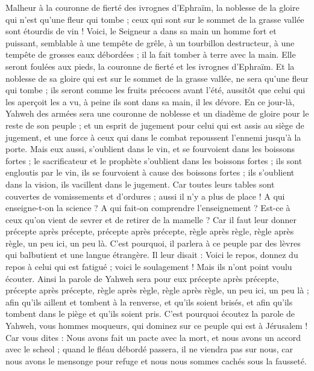 \begin{multicols}{2}
\VerseOne{}Malheur à la couronne de fierté des ivrognes d'Ephraïm, la noblesse de la gloire qui n'est qu'une fleur qui tombe ; ceux qui sont sur le sommet de la grasse vallée sont étourdis de vin !
Voici, le Seigneur a dans sa main un homme fort et puissant, semblable à une tempête de grêle, à un tourbillon destructeur, à une tempête de grosses eaux débordées ; il la fait tomber à terre avec la main.
Elle seront foulées aux pieds, la couronne de fierté et les ivrognes d'Ephraïm.
Et la noblesse de sa gloire qui est sur le sommet de la grasse vallée, ne sera qu'une fleur qui tombe ; ils seront comme les fruits précoces avant l'été, aussitôt que celui qui les aperçoit les a vu, à peine ils sont dans sa main, il les dévore.  
En ce jour-là, Yahweh des armées sera une couronne de noblesse et un diadème de gloire pour le reste de son peuple ;
et un esprit de jugement pour celui qui est assis au siège de jugement, et une force à ceux qui dans le combat repoussent l'ennemi jusqu'à la porte.
Mais eux aussi, s'oublient dans le vin, et se fourvoient dans les boissons fortes ; le sacrificateur et le prophète s'oublient dans les boissons fortes ; ils sont engloutis par le vin, ils se fourvoient à cause des boissons fortes ; ils s'oublient dans la vision, ils vacillent dans le jugement.
Car toutes leurs tables sont couvertes de vomissements et d'ordures ; aussi il n'y a plus de place !
A qui enseigne-t-on la science ? A qui fait-on comprendre l'enseignement ? Est-ce à ceux qu'on vient de sevrer et de retirer de la mamelle ?
Car il faut leur donner précepte après précepte, précepte après précepte, règle après règle, règle après règle, un peu ici, un peu là.
C'est pourquoi, il parlera à ce peuple par des lèvres qui balbutient et une langue étrangère.
Il leur disait : Voici le repos, donnez du repos à celui qui est fatigué ;  voici le soulagement ! Mais ils n'ont point voulu écouter.
Ainsi la parole de Yahweh sera pour eux précepte après précepte, précepte après précepte, règle après règle, règle après règle, un peu ici, un peu là ; afin qu'ils aillent et tombent à la renverse, et qu'ils soient brisés, et afin qu'ils tombent dans le piège et qu'ils soient pris.
C'est pourquoi écoutez la parole de Yahweh, vous hommes moqueurs, qui dominez sur ce peuple qui est à Jérusalem !
Car vous dites : Nous avons fait un pacte avec la mort, et nous avons un accord avec le scheol ; quand le fléau débordé passera, il ne viendra pas sur nous, car nous avons le mensonge pour refuge et nous nous sommes cachés sous la fausseté.

\end{multicols}
